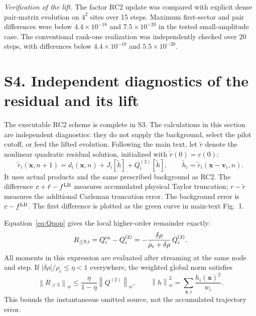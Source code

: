 \documentclass[10pt,letterpaper]{article}
\newcommand{\norm}[1]{\left\lVert#1\right\rVert}
\begin{document}
\textit{Verification of the lift.} The factor RC2 update was compared with explicit dense pair-matrix evolution on $4^2$ sites over 15 steps. Maximum first-sector and pair differences were below $4.4\times10^{-18}$ and $7.5\times10^{-20}$ in the tested small-amplitude case. The conventional rank-one realization was independently checked over 20 steps, with differences below $4.4\times10^{-18}$ and $5.5\times10^{-20}$.

\newpage
\section*{S4. Independent diagnostics of the residual and its lift}
The executable RC2 scheme is complete in S3. The calculations in this section are independent diagnostics: they do not supply the background, select the pilot cutoff, or feed the lifted evolution. Following the main text, let $\tilde r$ denote the nonlinear quadratic residual solution, initialized with $\tilde r(0)=r(0)$:
\begin{equation}
 \tilde r_i(\bm x,n+1)=d_i(\bm x,n)+J_i[\tilde h]+Q_i^{(2)}[\tilde h],
 \qquad \tilde h_i=\tilde r_i(\bm x-\bm v_i,n).
 \label{eq:diagnosticQ}
\end{equation}
It uses actual products and the same prescribed background as RC2. The difference $c+\tilde r-f^{\rm LB}$ measures accumulated physical Taylor truncation; $r-\tilde r$ measures the additional Carleman truncation error. The background error is $c-f^{\rm LB}$. The first difference is plotted as the green curve in main-text Fig.~1.

Equation~\eqref{eq:Qpop} gives the local higher-order remainder exactly:
\begin{equation}
 R_{\geq3,i}=Q_i^{\rm ex}-Q_i^{(2)}
 =-\frac{\delta\rho}{\rho_c+\delta\rho}\,Q_i^{(2)}.
\end{equation}
All moments in this expression are evaluated after streaming at the same node and step. If $|\delta\rho|/\rho_c\leq\eta<1$ everywhere, the weighted global norm satisfies
\begin{equation}
 \norm{R_{\geq3}}_w\leq\frac{\eta}{1-\eta}\norm{Q^{(2)}}_w,\qquad
 \norm{h}_w^2=\sum_{\bm x,i}\frac{h_i(\bm x)^2}{w_i}.
\end{equation}
This bounds the instantaneous omitted source, not the accumulated trajectory error.
\end{document}
